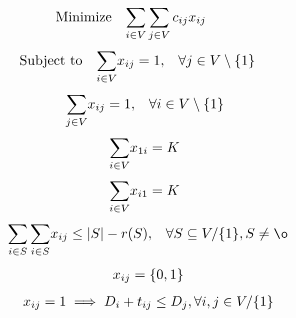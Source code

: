\documentclass[a4paper, 12pt]{report}
\begin{document}
\begin{equation}
    \begin{array}{ll@{}ll}
        \text{Minimize} & \displaystyle\sum\limits_{i \in V}\sum\limits_{j \in V} c_{ij}&x_{ij} &\\
    \end{array}
\end{equation}
\begin{equation}
    \begin{array}{ll@{}ll}
        \text{Subject to}&\displaystyle\sum\limits_{i \in V}   &x_{ij} = 1,  &\forall j \in V \setminus \{1\}\\
    \end{array}
\end{equation}
\begin{equation}
    \begin{array}{ll@{}ll}
        & \displaystyle\sum\limits_{j \in V}   &x_{ij} = 1,  &\forall i \in V \setminus \{1\}\\
    \end{array}
\end{equation}
\begin{equation}
    \begin{array}{ll@{}ll}
        & \displaystyle\sum\limits_{i \in V}   &x_{1i} = K\\
    \end{array}
\end{equation}
\begin{equation}
    \begin{array}{ll@{}ll}
        & \displaystyle\sum\limits_{i \in V}   &x_{i1} = K\\
    \end{array}
\end{equation}
\begin{equation}
    \begin{array}{ll@{}ll@{}ll}
        & \displaystyle\sum\limits_{i \in S}\sum\limits_{i \in S}  &x_{ij} \leq |S| - r(S), &\forall S \subseteq V/ \{1\} , S \neq \o \\
    \end{array}
\end{equation}
\begin{equation}
    \begin{array}{ll@{}ll@{}ll}
        & x_{ij} = \{0,1\}\\
    \end{array}
\end{equation}
\begin{equation}
    \begin{array}{ll@{}ll@{}ll}
        & x_{ij} = 1 \implies D_{i} + t_{ij} \leq D_{j}, \forall i, j \in V / \{1\}
    \end{array}
\end{equation}
\end{document}
